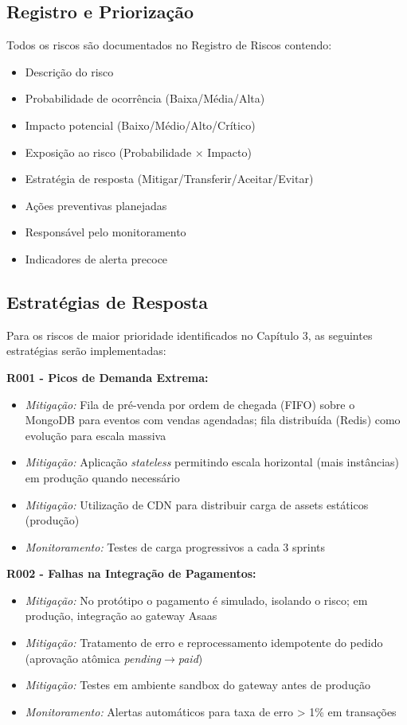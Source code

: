 \subsection{Registro e Priorização}

Todos os riscos são documentados no Registro de Riscos contendo:
\begin{itemize}
    \item Descrição do risco
    \item Probabilidade de ocorrência (Baixa/Média/Alta)
    \item Impacto potencial (Baixo/Médio/Alto/Crítico)
    \item Exposição ao risco (Probabilidade \(\times\) Impacto)
    \item Estratégia de resposta (Mitigar/Transferir/Aceitar/Evitar)
    \item Ações preventivas planejadas
    \item Responsável pelo monitoramento
    \item Indicadores de alerta precoce
\end{itemize}

\subsection{Estratégias de Resposta}

Para os riscos de maior prioridade identificados no Capítulo 3, as seguintes estratégias serão implementadas:

\textbf{R001 - Picos de Demanda Extrema:}
\begin{itemize}
    \item \textit{Mitigação:} Fila de pré-venda por ordem de chegada (FIFO) sobre o MongoDB para eventos com vendas agendadas; fila distribuída (Redis) como evolução para escala massiva
    \item \textit{Mitigação:} Aplicação \textit{stateless} permitindo escala horizontal (mais instâncias) em produção quando necessário
    \item \textit{Mitigação:} Utilização de CDN para distribuir carga de assets estáticos (produção)
    \item \textit{Monitoramento:} Testes de carga progressivos a cada 3 sprints
\end{itemize}

\textbf{R002 - Falhas na Integração de Pagamentos:}
\begin{itemize}
    \item \textit{Mitigação:} No protótipo o pagamento é simulado, isolando o risco; em produção, integração ao gateway Asaas
    \item \textit{Mitigação:} Tratamento de erro e reprocessamento idempotente do pedido (aprovação atômica \textit{pending}$\rightarrow$\textit{paid})
    \item \textit{Mitigação:} Testes em ambiente sandbox do gateway antes de produção
    \item \textit{Monitoramento:} Alertas automáticos para taxa de erro > 1\% em transações
\end{itemize}

